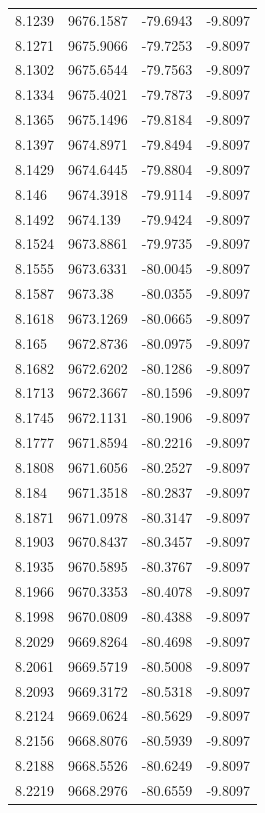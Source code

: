\begin{table}[H]
\begin{tabular}{llll}
8.1239 & 9676.1587 & -79.6943 & -9.8097 \\
8.1271 & 9675.9066 & -79.7253 & -9.8097 \\
8.1302 & 9675.6544 & -79.7563 & -9.8097 \\
8.1334 & 9675.4021 & -79.7873 & -9.8097 \\
8.1365 & 9675.1496 & -79.8184 & -9.8097 \\
8.1397 & 9674.8971 & -79.8494 & -9.8097 \\
8.1429 & 9674.6445 & -79.8804 & -9.8097 \\
8.146 & 9674.3918 & -79.9114 & -9.8097 \\
8.1492 & 9674.139 & -79.9424 & -9.8097 \\
8.1524 & 9673.8861 & -79.9735 & -9.8097 \\
8.1555 & 9673.6331 & -80.0045 & -9.8097 \\
8.1587 & 9673.38 & -80.0355 & -9.8097 \\
8.1618 & 9673.1269 & -80.0665 & -9.8097 \\
8.165 & 9672.8736 & -80.0975 & -9.8097 \\
8.1682 & 9672.6202 & -80.1286 & -9.8097 \\
8.1713 & 9672.3667 & -80.1596 & -9.8097 \\
8.1745 & 9672.1131 & -80.1906 & -9.8097 \\
8.1777 & 9671.8594 & -80.2216 & -9.8097 \\
8.1808 & 9671.6056 & -80.2527 & -9.8097 \\
8.184 & 9671.3518 & -80.2837 & -9.8097 \\
8.1871 & 9671.0978 & -80.3147 & -9.8097 \\
8.1903 & 9670.8437 & -80.3457 & -9.8097 \\
8.1935 & 9670.5895 & -80.3767 & -9.8097 \\
8.1966 & 9670.3353 & -80.4078 & -9.8097 \\
8.1998 & 9670.0809 & -80.4388 & -9.8097 \\
8.2029 & 9669.8264 & -80.4698 & -9.8097 \\
8.2061 & 9669.5719 & -80.5008 & -9.8097 \\
8.2093 & 9669.3172 & -80.5318 & -9.8097 \\
8.2124 & 9669.0624 & -80.5629 & -9.8097 \\
8.2156 & 9668.8076 & -80.5939 & -9.8097 \\
8.2188 & 9668.5526 & -80.6249 & -9.8097 \\
8.2219 & 9668.2976 & -80.6559 & -9.8097 \\

\end{tabular}
\end{table}
